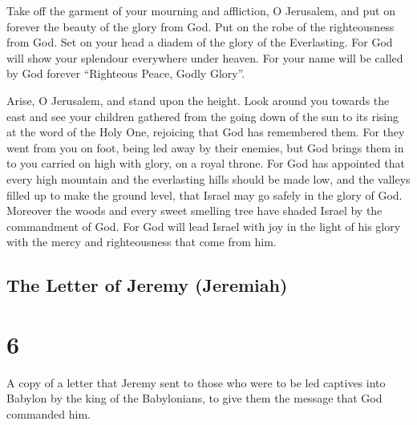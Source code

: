  Take off the garment of your mourning and affliction, O
Jerusalem, and put on forever the beauty of the glory from God.
 Put on the robe of the righteousness from God. Set on your
head a diadem of the glory of the Everlasting.  For God will
show your splendour everywhere under heaven.  For your name
will be called by God forever ``Righteous Peace, Godly Glory''.

 Arise, O Jerusalem, and stand upon the height. Look around
you towards the east and see your children gathered from the going down
of the sun to its rising at the word of the Holy One, rejoicing that God
has remembered them.  For they went from you on foot, being
led away by their enemies, but God brings them in to you carried on high
with glory, on a royal throne.  For God has appointed that
every high mountain and the everlasting hills should be made low, and
the valleys filled up to make the ground level, that Israel may go
safely in the glory of God.  Moreover the woods and every
sweet smelling tree have shaded Israel by the commandment of God.
 For God will lead Israel with joy in the light of his glory
with the mercy and righteousness that come from him.

\hypertarget{the-letter-of-jeremy-jeremiah}{%
\subsection{The Letter of Jeremy
(Jeremiah)}\label{the-letter-of-jeremy-jeremiah}}

\hypertarget{section-5}{%
\section{6}\label{section-5}}

 A copy of a letter that Jeremy sent to those who were to be
led captives into Babylon by the king of the Babylonians, to give them
the message that God commanded him.

